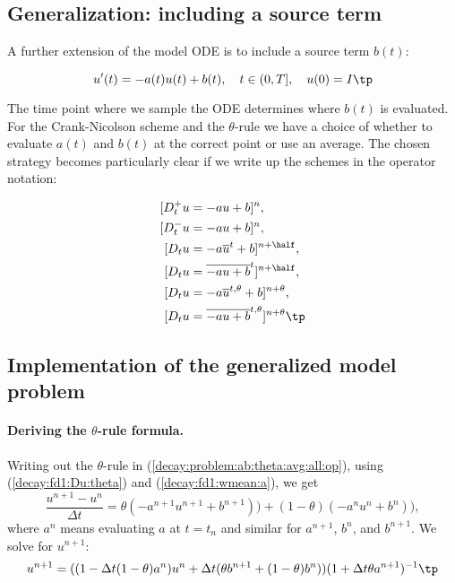 \documentclass[graybox,sectrefs,envcountresetchap,open=right,final]{svmonodo}
\begin{document}
\subsection{Generalization: including a source term}
\label{decay:source}

A further extension of the model ODE is to include a source term $b(t)$:

\begin{equation}
u^{\prime}(t) = -a(t)u(t) + b(t),\quad t\in (0,T],\quad u(0)=I
\tp
\label{decay:problem:ab}
\end{equation}

The time point where we sample the ODE determines where $b(t)$ is
evaluated. For the Crank-Nicolson scheme and the $\theta$-rule we
have a choice of whether to evaluate $a(t)$ and $b(t)$ at the
correct point or use an average. The chosen strategy becomes
particularly clear if we write up the schemes in the operator notation:

\begin{align}
\lbrack D^+_t u &= -au + b\rbrack^n,\\ 
\lbrack D^-_t u &= -au + b\rbrack^n,\\ 
\lbrack D_t u   &= -a\overline{u}^t + b\rbrack^{n+\half},\\ 
\lbrack D_t u   &= \overline{-au+b}^t\rbrack^{n+\half},\\ 
\lbrack D_t u   &= -a\overline{u}^{t,\theta} + b\rbrack^{n+\theta},\\ 
\lbrack D_t u   &= \overline{-au+b}^{t,\theta}\rbrack^{n+\theta}
\label{decay:problem:ab:theta:avg:all:op}
\tp
\end{align}

\subsection{Implementation of the generalized model problem}
\label{decay:general}

\paragraph{Deriving the $\theta$-rule formula.}
Writing out the $\theta$-rule in (\ref{decay:problem:ab:theta:avg:all:op}),
using (\ref{decay:fd1:Du:theta})
and (\ref{decay:fd1:wmean:a}), we get
\begin{equation}
\frac{u^{n+1}-u^n}{\Delta t} = \theta(-a^{n+1}u^{n+1} + b^{n+1}))
+ (1-\theta)(-a^nu^{n} + b^n)),
\label{decay:problem:ab:theta:avg:all}
\end{equation}
where $a^n$ means evaluating $a$ at $t=t_n$ and similar for
$a^{n+1}$, $b^n$, and $b^{n+1}$.
We solve for $u^{n+1}$:
\begin{equation}
u^{n+1} = ((1 - \Delta t(1-\theta)a^n)u^n
+ \Delta t(\theta b^{n+1} + (1-\theta)b^n))(1 + \Delta t\theta a^{n+1})^{-1}
\tp
\end{equation}
\end{document}
